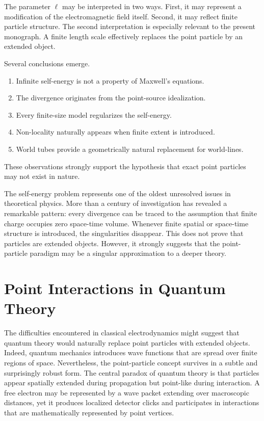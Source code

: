 The parameter $\ell$ may be interpreted in two ways.
First, it may represent a modification of the electromagnetic field itself.
Second, it may reflect finite particle structure.
The second interpretation is especially relevant to the present monograph.
A finite length scale effectively replaces the point particle by an extended object.

Several conclusions emerge.
\begin{enumerate}
\item Infinite self-energy is not a property of Maxwell's equations.
\item The divergence originates from the point-source idealization.
\item Every finite-size model regularizes the self-energy.
\item Non-locality naturally appears when finite extent is introduced.
\item World tubes provide a geometrically natural replacement for world-lines.
\end{enumerate}
These observations strongly support the hypothesis that exact point particles may not exist in nature.

The self-energy problem represents one of the oldest unresolved issues in 
theoretical physics.
More than a century of investigation has revealed a remarkable pattern: 
every divergence can be traced to the assumption that finite charge occupies
zero space-time volume. Whenever finite spatial or space-time structure is 
introduced, the singularities disappear.
This does not prove that particles are extended objects. However, it strongly 
suggests that the point-particle paradigm may be a singular approximation to a deeper theory. 

\section{Point Interactions in Quantum Theory}
The difficulties encountered in classical electrodynamics might suggest 
that quantum theory would naturally replace point particles with extended
objects. Indeed, quantum mechanics introduces wave functions that are spread
over finite regions of space. Nevertheless, the point-particle concept survives
in a subtle and surprisingly robust form.
The central paradox of quantum theory is that particles appear spatially 
extended during propagation but point-like during interaction. A free electron
may be represented by a wave packet extending over macroscopic distances, 
yet it produces localized detector clicks and participates in interactions that are
mathematically represented by point vertices.

